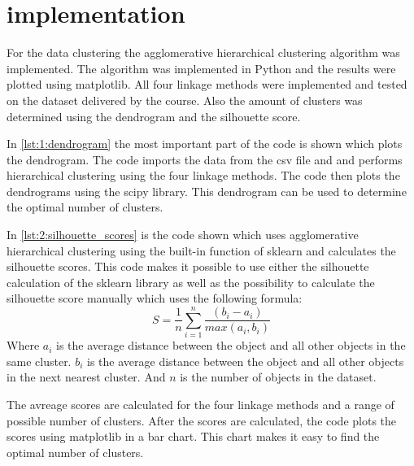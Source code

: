 \documentclass[twoside, a4paper, fleqn, reqno]{article}
\begin{document}
\section{implementation}
For the data clustering the agglomerative hierarchical clustering algorithm was implemented.
The algorithm was implemented in Python and the results were plotted using matplotlib.
All four linkage methods were implemented and tested on the dataset delivered by the course.
Also the amount of clusters was determined using the dendrogram and the silhouette score.



In \autoref{lst:1:dendrogram} the most important part of the code is shown which plots the dendrogram.
The code imports the data from the csv file and and performs hierarchical clustering using
the four linkage methods. The code then plots the dendrograms using the scipy library.
This dendrogram can be used to determine the optimal number of clusters.



In \autoref{lst:2:silhouette_scores} is the code shown which uses agglomerative hierarchical clustering
using the built-in function of sklearn and calculates the silhouette scores.
This code makes it possible to use either the silhouette calculation of the sklearn library
as well as the possibility to calculate the silhouette score manually which uses the following formula:
\begin{equation*}
S = \frac{1}{n} \sum_{i=1}^n \frac{(b_i - a_i)}{max(a_i, b_i)}
\end{equation*}
Where $a_i$ is the average distance between the object and all other objects in the same cluster.
$b_i$ is the average distance between the object and all other objects in the next nearest cluster.
And $n$ is the number of objects in the dataset.
\par
The avreage scores are calculated for the four linkage methods and a range of possible number of clusters.
After the scores are calculated, the code plots the scores using matplotlib in a bar chart.
This chart makes it easy to find the optimal number of clusters.


\end{document}
